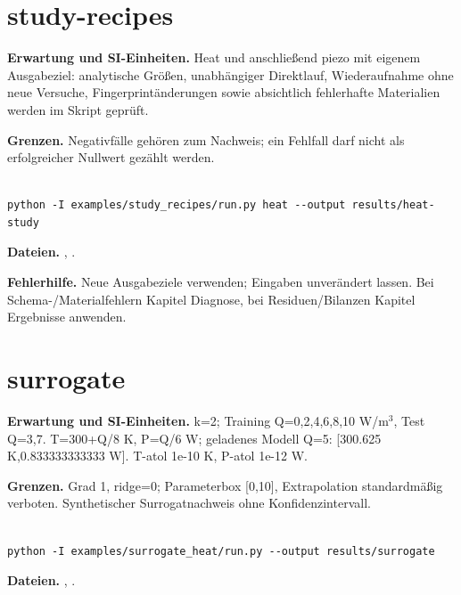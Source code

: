 

\section{study-recipes}\label{recipe:study-recipes}

\textbf{Erwartung und SI-Einheiten.} Heat und anschließend piezo mit eigenem Ausgabeziel: analytische Größen, unabhängiger Direktlauf, Wiederaufnahme ohne neue Versuche, Fingerprintänderungen sowie absichtlich fehlerhafte Materialien werden im Skript geprüft.

\textbf{Grenzen.} Negativfälle gehören zum Nachweis; ein Fehlfall darf nicht als erfolgreicher Nullwert gezählt werden.

\begin{lstlisting}

python -I examples/study_recipes/run.py heat --output results/heat-study

\end{lstlisting}

\textbf{Dateien.} , .

\textbf{Fehlerhilfe.} Neue Ausgabeziele verwenden; Eingaben unverändert lassen. Bei Schema-/Materialfehlern Kapitel Diagnose, bei Residuen/Bilanzen Kapitel Ergebnisse anwenden.



\section{surrogate}\label{recipe:surrogate}

\textbf{Erwartung und SI-Einheiten.} k=2; Training Q=0,2,4,6,8,10 W/m$^3$, Test Q=3,7. T=300+Q/8 K, P=Q/6 W; geladenes Modell Q=5: [300.625 K,0.833333333333 W]. T-atol 1e-10 K, P-atol 1e-12 W.

\textbf{Grenzen.} Grad 1, ridge=0; Parameterbox [0,10], Extrapolation standardmäßig verboten. Synthetischer Surrogatnachweis ohne Konfidenzintervall.

\begin{lstlisting}

python -I examples/surrogate_heat/run.py --output results/surrogate

\end{lstlisting}

\textbf{Dateien.} , .

